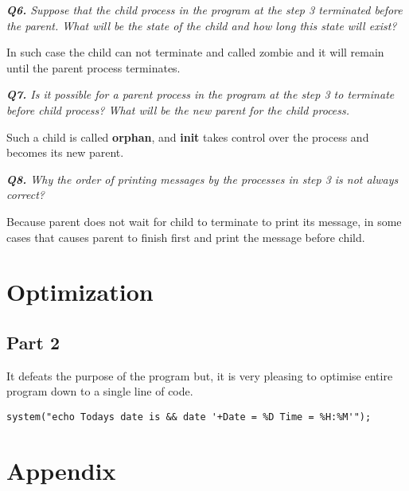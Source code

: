 \documentclass[11pt]{article}
\begin{document}
\vspace{5mm}
\textit{\textbf{Q6.} Suppose that the child process in the program at the step 3 terminated before the parent. What will be the state of the child and how long this state will exist?}
\vspace{5mm}

In such case the child can not terminate and called zombie and it will remain until the parent process terminates.

\vspace{5mm}
\textit{\textbf{Q7.} Is it possible for a parent process in the program at the step 3 to terminate before child process? What will be the new parent for the child process.}
\vspace{5mm}

Such a child is called \textbf{orphan}, and \textbf{init} takes control over the process and becomes its new parent.

\vspace{5mm}
\textit{\textbf{Q8.} Why the order of printing messages by the processes in step 3 is not always correct?}
\vspace{5mm}

Because parent does not wait for child to terminate to print its message, in some cases that causes parent to finish first and print the message before child.

\section*{Optimization}

\subsection*{Part 2}

It defeats the purpose of the program but, it is very pleasing to optimise entire program down to a single line of code.

\vspace{2mm}
\begin{minipage}{1\textwidth}
\begin{lstlisting}[frame=tlrb]
system("echo Todays date is && date '+Date = %D Time = %H:%M'");
\end{lstlisting}
\end{minipage}

\newpage

\section*{Appendix}
\end{document}
